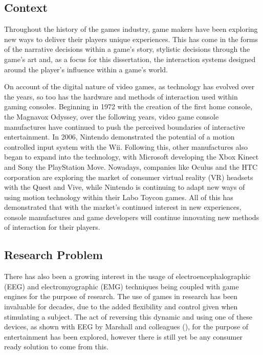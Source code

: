 \documentclass[11pt, a4paper]{article}
\newcommand{\cciteyear}[1]{(\citeyear{#1})}
\begin{document}
\subsection{Context}

Throughout the history of the games industry, game makers have been exploring new ways to deliver their players unique experiences. This has come in the forms of the narrative decisions within a game's story, stylistic decisions through the game's art and, as a focus for this dissertation, the interaction systems designed around the player's influence within a game's world. 

\hfill

On account of the digital nature of video games, as technology has evolved over the years, so too has the hardware and methods of interaction used within gaming consoles. Beginning in 1972 with the creation of the first home console, the Magnavox Odyssey, over the following years, video game console manufactures have continued to push the perceived boundaries of interactive entertainment. In 2006, Nintendo demonstrated the potential of a motion controlled input system with the Wii. Following this, other manufactures also began to expand into the technology, with Microsoft developing the Xbox Kinect and Sony the PlayStation Move. Nowadays, companies like Oculus and the HTC corporation are exploring the market of consumer virtual reality (VR) headsets with the Quest and Vive, while Nintendo is continuing to adapt new ways of using motion technology within their Labo Toycon games. All of this has demonstrated that with the market's continued interest in new experiences, console manufactures and game developers will continue innovating new methods of interaction for their players.

\subsection{Research Problem}

There has also been a growing interest in the usage of electroencephalographic (EEG) and electromyographic (EMG) techniques being coupled with game engines for the purpose of research. The use of games in research has been invaluable for decades, due to the added flexibility and control given when stimulating a subject. The act of reversing this dynamic and using one of these devices, as shown with EEG by Marshall and colleagues \cciteyear{6518141}, for the purpose of entertainment has been explored, however there is still yet be any consumer ready solution to come from this. 
\end{document}
